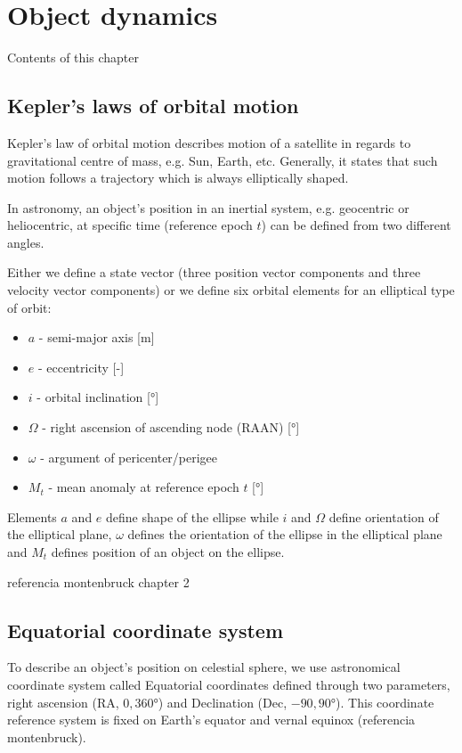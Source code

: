 \chapter{Object dynamics}\label{chap:object_dynamics}

	Contents of this chapter 

\section{Kepler's laws of orbital motion}\label{sec:kepler}
	
	Kepler's law of orbital motion describes motion of a satellite in regards to gravitational centre of mass, e.g. Sun, Earth, etc. Generally, it states that such motion follows a trajectory which is always elliptically shaped.
	
	In astronomy, an object's position in an inertial system, e.g. geocentric or heliocentric, at specific time (reference epoch $t$) can be defined from two different angles.
	
	Either we define a state vector (three position vector components and three velocity vector components) or we define six orbital elements for an elliptical type of orbit:
	
	\begin{itemize}
		\item $a$ - semi-major axis [m]
		\item $e$ - eccentricity [-]
		\item $i$ - orbital inclination [°]
		\item $\Omega$ - right ascension of ascending node (RAAN) [°]
		\item $\omega$ - argument of pericenter/perigee
		\item $M_t$ - mean anomaly at reference epoch $t$ [°]
	\end{itemize}
	
	Elements $a$ and $e$ define shape of the ellipse while $i$ and $\Omega$ define orientation of the elliptical plane, $\omega$ defines the orientation of the ellipse in the elliptical plane and $M_t$ defines position of an object on the ellipse.
	
	referencia montenbruck chapter 2

\section{Equatorial coordinate system}\label{sec:ra_dec}
	
	To describe an object's position on celestial sphere, we use astronomical coordinate system called Equatorial coordinates defined through two parameters, right ascension (RA, $0,360°$) and Declination (Dec, $-90,90°$). This coordinate reference system is fixed on Earth's equator and vernal equinox (referencia montenbruck).
	
